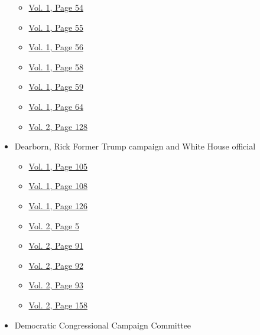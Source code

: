 \begin{itemize}
  \begin{itemize}
  \tightlist
  \item
    \protect\hyperlink{g-page-62}{Vol. 1, Page 54}
  \item
    \protect\hyperlink{g-page-63}{Vol. 1, Page 55}
  \item
    \protect\hyperlink{g-page-64}{Vol. 1, Page 56}
  \item
    \protect\hyperlink{g-page-66}{Vol. 1, Page 58}
  \item
    \protect\hyperlink{g-page-67}{Vol. 1, Page 59}
  \item
    \protect\hyperlink{g-page-72}{Vol. 1, Page 64}
  \item
    \protect\hyperlink{g-page-340}{Vol. 2, Page 128}
  \end{itemize}
\item
  Dearborn, Rick Former Trump campaign and White House official

  \begin{itemize}
  \tightlist
  \item
    \protect\hyperlink{g-page-113}{Vol. 1, Page 105}
  \item
    \protect\hyperlink{g-page-116}{Vol. 1, Page 108}
  \item
    \protect\hyperlink{g-page-134}{Vol. 1, Page 126}
  \item
    \protect\hyperlink{g-page-217}{Vol. 2, Page 5}
  \item
    \protect\hyperlink{g-page-303}{Vol. 2, Page 91}
  \item
    \protect\hyperlink{g-page-304}{Vol. 2, Page 92}
  \item
    \protect\hyperlink{g-page-305}{Vol. 2, Page 93}
  \item
    \protect\hyperlink{g-page-370}{Vol. 2, Page 158}
  \end{itemize}
\item
  Democratic Congressional Campaign Committee


\end{itemize}
